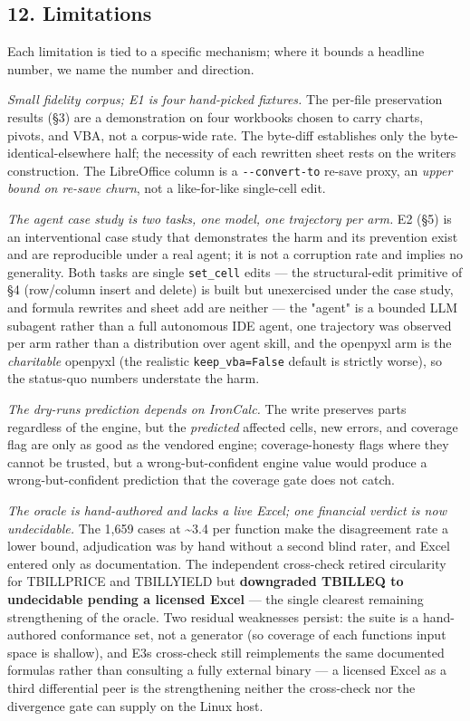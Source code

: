 \documentclass[
]{article}
\begin{document}
\subsection{12. Limitations}\label{12-limitations}

Each limitation is tied to a specific mechanism; where it bounds a
headline number, we name the number and direction.

\emph{Small fidelity corpus; E1 is four hand-picked fixtures.} The
per-file preservation results (§3) are a demonstration on four workbooks
chosen to carry charts, pivots, and VBA, not a corpus-wide rate. The
byte-diff establishes only the byte-identical-elsewhere half; the
necessity of each rewritten sheet rests on the writer\textquotesingle s
construction. The LibreOffice column is a \texttt{-\/-convert-to}
re-save proxy, an \emph{upper bound on re-save churn}, not a
like-for-like single-cell edit.

\emph{The agent case study is two tasks, one model, one trajectory per
arm.} E2 (§5) is an interventional case study that demonstrates the harm
and its prevention exist and are reproducible under a real agent; it is
not a corruption rate and implies no generality. Both tasks are single
\texttt{set\_cell} edits --- the structural-edit primitive of §4
(row/column insert and delete) is built but unexercised under the case
study, and formula rewrites and sheet add are neither --- the "agent" is
a bounded LLM subagent rather than a full autonomous IDE agent, one
trajectory was observed per arm rather than a distribution over agent
skill, and the openpyxl arm is the \emph{charitable} openpyxl (the
realistic \texttt{keep\_vba=False} default is strictly worse), so the
status-quo numbers understate the harm.

\emph{The dry-run\textquotesingle s prediction depends on IronCalc.} The
write preserves parts regardless of the engine, but the \emph{predicted}
affected cells, new errors, and coverage flag are only as good as the
vendored engine; coverage-honesty flags where they cannot be trusted,
but a wrong-but-confident engine value would produce a
wrong-but-confident prediction that the coverage gate does not catch.

\emph{The oracle is hand-authored and lacks a live Excel; one financial
verdict is now undecidable.} The 1,659 cases at \textasciitilde3.4 per
function make the disagreement rate a lower bound, adjudication was by
hand without a second blind rater, and Excel entered only as
documentation. The independent cross-check retired circularity for
TBILLPRICE and TBILLYIELD but \textbf{downgraded TBILLEQ to undecidable
pending a licensed Excel} --- the single clearest remaining
strengthening of the oracle. Two residual weaknesses persist: the suite
is a hand-authored conformance set, not a generator (so coverage of each
function\textquotesingle s input space is shallow), and
E3\textquotesingle s cross-check still reimplements the same documented
formulas rather than consulting a fully external binary --- a licensed
Excel as a third differential peer is the strengthening neither the
cross-check nor the divergence gate can supply on the Linux host.
\end{document}
